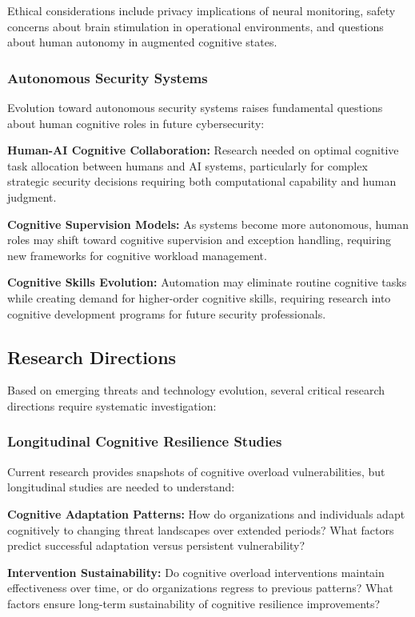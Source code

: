 \documentclass[11pt,a4paper]{article}
\begin{document}
Ethical considerations include privacy implications of neural monitoring, safety concerns about brain stimulation in operational environments, and questions about human autonomy in augmented cognitive states.

\subsubsection{Autonomous Security Systems}

Evolution toward autonomous security systems raises fundamental questions about human cognitive roles in future cybersecurity:

\textbf{Human-AI Cognitive Collaboration:} Research needed on optimal cognitive task allocation between humans and AI systems, particularly for complex strategic security decisions requiring both computational capability and human judgment.

\textbf{Cognitive Supervision Models:} As systems become more autonomous, human roles may shift toward cognitive supervision and exception handling, requiring new frameworks for cognitive workload management.

\textbf{Cognitive Skills Evolution:} Automation may eliminate routine cognitive tasks while creating demand for higher-order cognitive skills, requiring research into cognitive development programs for future security professionals.

\subsection{Research Directions}

Based on emerging threats and technology evolution, several critical research directions require systematic investigation:

\subsubsection{Longitudinal Cognitive Resilience Studies}

Current research provides snapshots of cognitive overload vulnerabilities, but longitudinal studies are needed to understand:

\textbf{Cognitive Adaptation Patterns:} How do organizations and individuals adapt cognitively to changing threat landscapes over extended periods? What factors predict successful adaptation versus persistent vulnerability?

\textbf{Intervention Sustainability:} Do cognitive overload interventions maintain effectiveness over time, or do organizations regress to previous patterns? What factors ensure long-term sustainability of cognitive resilience improvements?
\end{document}
